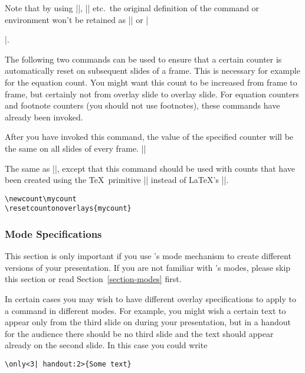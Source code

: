 Note that by using |\NewDocumentCommand|, |\NewDocumentEnvironment| etc.\  the original definition of the command or environment won't be retained as || or |\begin{original...}|.

The following two commands can be used to ensure that a certain counter is automatically reset on subsequent slides of a frame. This is necessary for example for the equation count. You might want this count to be increased from frame to frame, but certainly not from overlay slide to overlay slide. For equation counters and footnote counters (you should not use footnotes), these commands have already been invoked.

\begin{command}{\resetcounteronoverlays{}}
  After you have invoked this command, the value of the specified counter will be the same on all slides of every frame.
  \example
  ||
\end{command}

\begin{command}{\resetcountonoverlays{}}
  The same as |\resetcounteronoverlays|, except that this command should be used with counts that have been created using the \TeX\ primitive |\newcount| instead of \LaTeX's ||.
  \example
\begin{verbatim}
\newcount\mycount
\resetcountonoverlays{mycount}
\end{verbatim}
\end{command}

\subsubsection{Mode Specifications}

This section is only important if you use \beamer's mode mechanism to create different versions of your presentation. If you are not familiar with \beamer's modes, please skip this section or read Section~\ref{section-modes} first.

In certain cases you may wish to have different overlay specifications to apply to a command in different modes. For example, you might wish a certain text to appear only from the third slide on during your presentation, but in a handout for the audience there should be no third slide and the text should appear already on the second slide. In this case you could write
\begin{verbatim}
\only<3| handout:2>{Some text}
\end{verbatim}


\end{original...}
